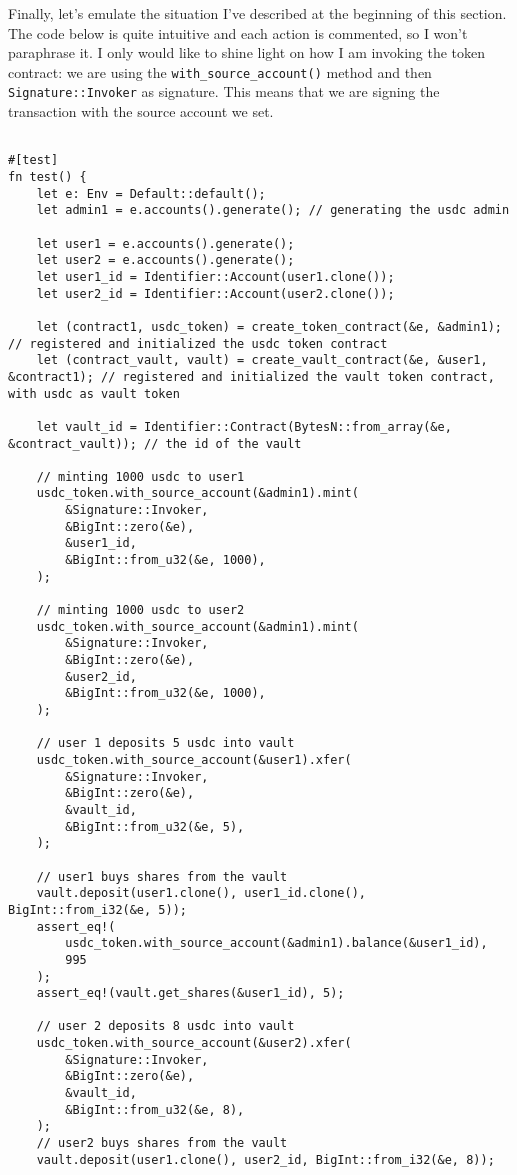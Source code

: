\documentclass{article}
\newcommand{\inl}[1]{\lstinline{#1}}
\begin{document}
Finally, let's emulate the situation I've described at the beginning of this section. The code below is quite intuitive and each action is commented, so I won't paraphrase it. I only would like to shine light on how I am invoking the token contract: we are using the \inl{with_source_account()} method and then \inl{Signature::Invoker} as signature. This means that we are signing the transaction with the source account we set.

\begin{lstlisting}
  
#[test]
fn test() {
    let e: Env = Default::default();
    let admin1 = e.accounts().generate(); // generating the usdc admin

    let user1 = e.accounts().generate();
    let user2 = e.accounts().generate();
    let user1_id = Identifier::Account(user1.clone());
    let user2_id = Identifier::Account(user2.clone());

    let (contract1, usdc_token) = create_token_contract(&e, &admin1); // registered and initialized the usdc token contract
    let (contract_vault, vault) = create_vault_contract(&e, &user1, &contract1); // registered and initialized the vault token contract, with usdc as vault token

    let vault_id = Identifier::Contract(BytesN::from_array(&e, &contract_vault)); // the id of the vault

    // minting 1000 usdc to user1
    usdc_token.with_source_account(&admin1).mint(
        &Signature::Invoker,
        &BigInt::zero(&e),
        &user1_id,
        &BigInt::from_u32(&e, 1000),
    );

    // minting 1000 usdc to user2
    usdc_token.with_source_account(&admin1).mint(
        &Signature::Invoker,
        &BigInt::zero(&e),
        &user2_id,
        &BigInt::from_u32(&e, 1000),
    );

    // user 1 deposits 5 usdc into vault
    usdc_token.with_source_account(&user1).xfer(
        &Signature::Invoker,
        &BigInt::zero(&e),
        &vault_id,
        &BigInt::from_u32(&e, 5),
    );

    // user1 buys shares from the vault
    vault.deposit(user1.clone(), user1_id.clone(), BigInt::from_i32(&e, 5));
    assert_eq!(
        usdc_token.with_source_account(&admin1).balance(&user1_id),
        995
    );
    assert_eq!(vault.get_shares(&user1_id), 5);

    // user 2 deposits 8 usdc into vault
    usdc_token.with_source_account(&user2).xfer(
        &Signature::Invoker,
        &BigInt::zero(&e),
        &vault_id,
        &BigInt::from_u32(&e, 8),
    );
    // user2 buys shares from the vault
    vault.deposit(user1.clone(), user2_id, BigInt::from_i32(&e, 8));


\end{lstlisting}
\end{document}

